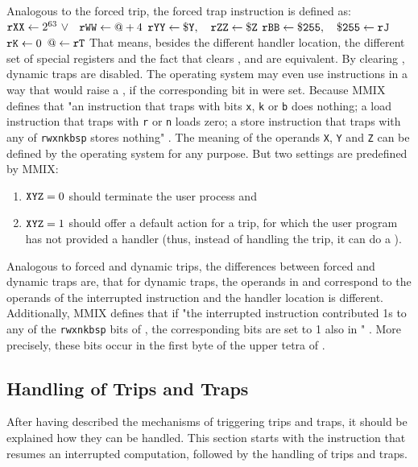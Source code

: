 Analogous to the forced trip, the forced trap instruction is defined as:
\instrtblsix
	{}
	{${\tt rXX} \leftarrow 2^{63}~\lor$~}
	{${\tt rWW} \leftarrow @ + 4$}
	{${\tt rYY} \leftarrow {\tt \$Y},\quad {\tt rZZ} \leftarrow {\tt \$Z}$}
	{${\tt rBB} \leftarrow {\tt \$255},\quad {\tt \$255} \leftarrow {\tt rJ}$}
	{${\tt rK} \leftarrow 0$}
	{$@ \leftarrow {\tt rT}$}
\noindent That means, besides the different handler location, the different set of special registers and the fact that  clears ,  and  are equivalent. By clearing , dynamic traps are disabled. \citep[pg. 28]{mmix-doc} The operating system may even use instructions in a way that would raise a , if the corresponding bit in  were set. Because MMIX defines that "an instruction that traps with bits {\tt x}, {\tt k} or {\tt b} does nothing; a load instruction that traps with {\tt r} or {\tt n} loads zero; a store instruction that traps with any of {\tt rwxnkbsp} stores nothing" \citep[pg. 29]{mmix-doc}. The meaning of the operands {\tt X}, {\tt Y} and {\tt Z} can be defined by the operating system for any purpose. But two settings are predefined by MMIX:
\begin{enumerate}
	\item ${\tt XYZ} = 0$ should terminate the user process and
	\item ${\tt XYZ} = 1$ should offer a default action for a trip, for which the user program has not provided a handler (thus, instead of handling the trip, it can do a ).
\end{enumerate}

Analogous to forced and dynamic trips, the differences between forced and dynamic traps are, that for dynamic traps, the operands in  and  correspond to the operands of the interrupted instruction and the handler location is different. Additionally, MMIX defines that if "the interrupted instruction contributed 1s to any of the {\tt rwxnkbsp} bits of , the corresponding bits are set to 1 also in " \citep[pg. 29]{mmix-doc}. More precisely, these bits occur in the first byte of the upper tetra of .

\subsection{Handling of Trips and Traps}

After having described the mechanisms of triggering trips and traps, it should be explained how they can be handled. This section starts with the instruction that resumes an interrupted computation, followed by the handling of trips and traps.

